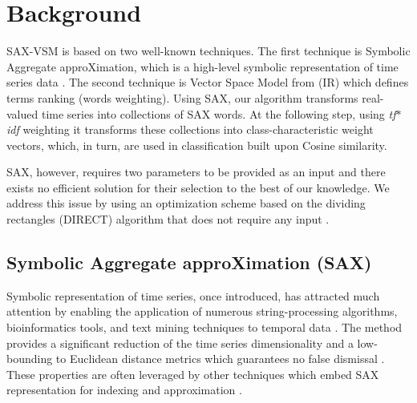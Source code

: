 \documentclass[conference]{IEEEtran}
\begin{document}
\section{Background} \label{background}
SAX-VSM is based on two well-known techniques. The first technique is 
Symbolic Aggregate approXimation, which is a high-level symbolic
representation of time series data \cite{sax}. 
The second technique is Vector Space Model from (IR) \cite{salton}
which defines terms ranking (words weighting). 
Using SAX, our algorithm transforms real-valued time series into collections 
of SAX words. At the following step, using \textit{tf$\ast$idf} weighting it 
transforms these collections into class-characteristic weight vectors, 
which, in turn, are used in classification built upon Cosine similarity.


SAX, however, requires two parameters to be provided as an input and there exists 
no efficient solution for their selection to the best of our knowledge. 
We address this issue by using an optimization scheme based on the dividing 
rectangles (DIRECT) algorithm that does not require any input \cite{direct}. 

\subsection{Symbolic Aggregate approXimation (SAX)} \label{section-sax}
Symbolic representation of time series, once introduced, has attracted much attention by
enabling the application of numerous string-processing algorithms, bioinformatics tools, and text mining 
techniques to temporal data \cite{sax}. The method provides a significant reduction of the time series 
dimensionality and a low-bounding to Euclidean distance metrics which guarantees no false 
dismissal \cite{hot_sax}.
These properties are often leveraged by other techniques which embed SAX representation 
for indexing and approximation \cite{fast-shapelets}.
\end{document}
